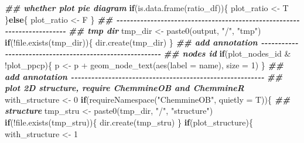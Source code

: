 \documentclass[
]{article}
\newenvironment{Shaded}{\begin{snugshade}}{\end{snugshade}}
\newcommand{\AttributeTok}[1]{\textcolor[rgb]{0.77,0.63,0.00}{#1}}
\newcommand{\ControlFlowTok}[1]{\textcolor[rgb]{0.13,0.29,0.53}{\textbf{#1}}}
\newcommand{\DecValTok}[1]{\textcolor[rgb]{0.00,0.00,0.81}{#1}}
\newcommand{\DocumentationTok}[1]{\textcolor[rgb]{0.56,0.35,0.01}{\textbf{\textit{#1}}}}
\newcommand{\FunctionTok}[1]{\textcolor[rgb]{0.00,0.00,0.00}{#1}}
\newcommand{\NormalTok}[1]{#1}
\newcommand{\OtherTok}[1]{\textcolor[rgb]{0.56,0.35,0.01}{#1}}
\newcommand{\SpecialCharTok}[1]{\textcolor[rgb]{0.00,0.00,0.00}{#1}}
\newcommand{\StringTok}[1]{\textcolor[rgb]{0.31,0.60,0.02}{#1}}
\begin{document}
\begin{Shaded}
\begin{Highlighting}[]
    \DocumentationTok{\#\# whether plot pie diagram}
    \ControlFlowTok{if}\NormalTok{(}\FunctionTok{is.data.frame}\NormalTok{(ratio\_df))\{}
\NormalTok{      plot\_ratio }\OtherTok{\textless{}{-}}\NormalTok{ T}
\NormalTok{    \}}\ControlFlowTok{else}\NormalTok{\{}
\NormalTok{      plot\_ratio }\OtherTok{\textless{}{-}}\NormalTok{ F}
\NormalTok{    \}}
    \DocumentationTok{\#\# {-}{-}{-}{-}{-}{-}{-}{-}{-}{-}{-}{-}{-}{-}{-}{-}{-}{-}{-}{-}{-}{-}{-}{-}{-}{-}{-}{-}{-}{-}{-}{-}{-}{-}{-}{-}{-}{-}{-}{-}{-}{-}{-}{-}{-}{-}{-}{-}{-}{-}{-}{-}{-}{-}{-}{-}{-}{-}{-}{-}{-}{-}{-}{-}{-}{-}{-}{-}{-}{-}{-}{-}}
    \DocumentationTok{\#\# tmp dir}
\NormalTok{    tmp\_dir }\OtherTok{\textless{}{-}} \FunctionTok{paste0}\NormalTok{(output, }\StringTok{"/"}\NormalTok{, }\StringTok{"tmp"}\NormalTok{)}
    \ControlFlowTok{if}\NormalTok{(}\SpecialCharTok{!}\FunctionTok{file.exists}\NormalTok{(tmp\_dir))\{}
      \FunctionTok{dir.create}\NormalTok{(tmp\_dir)}
\NormalTok{    \}}
    \DocumentationTok{\#\# add annotation {-}{-}{-}{-}{-}{-}{-}{-}{-}{-}{-}{-}{-}{-}{-}{-}{-}{-}{-}{-}{-}{-}{-}{-}{-}{-}{-}{-}{-}{-}{-}{-}{-}{-}{-}{-}{-}{-}{-}{-}{-}{-}{-}{-}{-}{-}{-}{-}{-}{-}{-}{-}{-}{-}{-}{-}{-}}
    \DocumentationTok{\#\# nodes id}
    \ControlFlowTok{if}\NormalTok{(plot\_nodes\_id  }\SpecialCharTok{\&} \SpecialCharTok{!}\NormalTok{plot\_ppcp)\{}
\NormalTok{      p }\OtherTok{\textless{}{-}}\NormalTok{ p }\SpecialCharTok{+} \FunctionTok{geom\_node\_text}\NormalTok{(}\FunctionTok{aes}\NormalTok{(}\AttributeTok{label =}\NormalTok{ name), }\AttributeTok{size =} \DecValTok{1}\NormalTok{)}
\NormalTok{    \}}
    \DocumentationTok{\#\# add annotation {-}{-}{-}{-}{-}{-}{-}{-}{-}{-}{-}{-}{-}{-}{-}{-}{-}{-}{-}{-}{-}{-}{-}{-}{-}{-}{-}{-}{-}{-}{-}{-}{-}{-}{-}{-}{-}{-}{-}{-}{-}{-}{-}{-}{-}{-}{-}{-}{-}{-}{-}{-}{-}{-}{-}{-}{-}}
    \DocumentationTok{\#\# plot 2D structure, require ChemmineOB and ChemmineR}
\NormalTok{    with\_structure }\OtherTok{\textless{}{-}} \DecValTok{0}
    \ControlFlowTok{if}\NormalTok{(}\FunctionTok{requireNamespace}\NormalTok{(}\StringTok{"ChemmineOB"}\NormalTok{, }\AttributeTok{quietly =}\NormalTok{ T))\{}
      \DocumentationTok{\#\# structure}
\NormalTok{      tmp\_stru }\OtherTok{\textless{}{-}} \FunctionTok{paste0}\NormalTok{(tmp\_dir, }\StringTok{"/"}\NormalTok{, }\StringTok{"structure"}\NormalTok{)}
      \ControlFlowTok{if}\NormalTok{(}\SpecialCharTok{!}\FunctionTok{file.exists}\NormalTok{(tmp\_stru))\{}
        \FunctionTok{dir.create}\NormalTok{(tmp\_stru)}
\NormalTok{      \}}
      \ControlFlowTok{if}\NormalTok{(plot\_structure)\{}
\NormalTok{        with\_structure }\OtherTok{\textless{}{-}} \DecValTok{1}

\end{Highlighting}
\end{Shaded}
\end{document}
